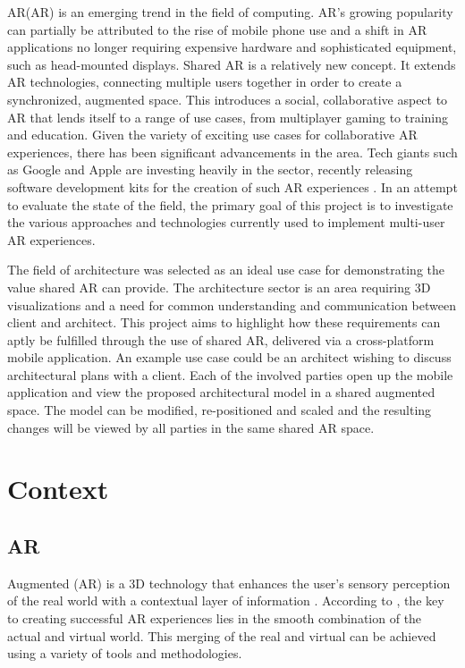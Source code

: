AR(AR) is an emerging trend in the field of computing. AR’s growing popularity can partially be attributed to the rise of mobile phone use and a shift in AR applications no longer requiring expensive hardware and sophisticated equipment, such as head-mounted displays. Shared AR is a relatively new concept. It extends AR technologies, connecting multiple users together in order to create a synchronized, augmented space. This introduces a social, collaborative aspect to AR that lends itself to a range of use cases, from multiplayer gaming to training and education. Given the variety of exciting use cases for collaborative AR experiences, there has been significant advancements in the area. Tech giants such as Google and Apple are investing heavily in the sector, recently releasing software development kits for the creation of such AR experiences \cite{arcore} \cite{arkit}. In an attempt to evaluate the state of the field, the primary goal of this project is to investigate the various approaches and technologies currently used to implement multi-user AR experiences.

The field of architecture was selected as an ideal use case for demonstrating the value shared AR can provide. The architecture sector is an area requiring 3D visualizations and a need for common understanding and communication between client and architect. This project aims to highlight how these requirements can aptly be fulfilled through the use of shared AR, delivered via a cross-platform mobile application. An example use case could be an architect wishing to discuss architectural plans with a client. Each of the involved parties open up the mobile application and view the proposed architectural model in a shared augmented space. The model can be modified, re-positioned and scaled and the resulting changes will be viewed by all parties in the same shared AR space.  


\section{Context}
\subsection{AR}
Augmented (AR) is a 3D technology that enhances the user’s sensory perception of the real world with a contextual layer of information  \cite{azuma1997survey}. According to \cite{martin2015augmented}, the key to creating successful AR experiences lies in the smooth combination of the actual and virtual world. This merging of the real and virtual can be achieved using a variety of tools and methodologies. 

